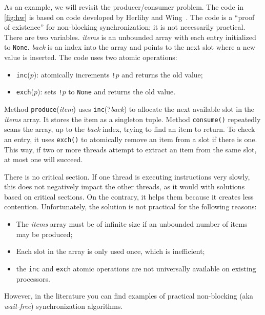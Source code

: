 \documentclass{report}
\begin{document}
As an example, we will revisit the producer/consumer problem.
The code in \autoref{fig:hw} is based on code developed by Herlihy and
Wing~\cite{HW87}.
The code is a ``proof of existence'' for non-blocking synchronization; it
is not necessarily practical.
There are two variables.  \textit{items} is an unbounded array with each
entry initialized to \texttt{None}.  \textit{back} is an index into the
array and points to the next slot where a new value is inserted.
The code uses two atomic operations:
\begin{itemize}
\item \texttt{inc}($p$): atomically increments \texttt{!}$p$ and returns
the old value;
\item \texttt{exch}($p$): sets \texttt{!}$p$ to \texttt{None} and returns
the old value.
\end{itemize}

Method \texttt{produce}(\textit{item}) uses \texttt{inc}(?\textit{back})
to allocate
the next available slot in the \textit{items} array.
It stores the item as a singleton tuple.
Method \texttt{consume()} repeatedly scans the array, up to the
\textit{back} index, trying to find an item to return.
To check an entry, it uses \texttt{exch()}
to atomically remove an item from a slot if there is one.
This way, if two or more threads attempt to extract an item from
the same slot, at most one will succeed.

There is no critical section.  If one thread is executing instructions
very slowly, this does not negatively impact the other threads, as it
would with solutions based on critical sections.
On the contrary, it helps them because it creates less contention.
Unfortunately, the solution is not practical for the following reasons:
\begin{itemize}
\item The \textit{items} array must be of infinite size if an unbounded number
of items may be produced;
\item Each slot in the array is only used once, which is inefficient;
\item the \texttt{inc} and \texttt{exch} atomic operations are not
universally available on existing processors.
\end{itemize}
However, in the literature you can find examples of practical
non-blocking (aka \emph{wait-free})
%
synchronization algorithms.

\end{document}
